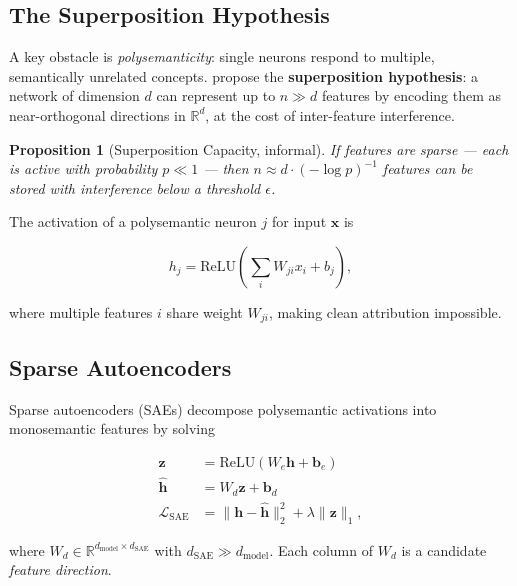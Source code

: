 \documentclass[10pt,twocolumn]{article}
\newtheorem{proposition}[theorem]{Proposition}
\begin{document}
\subsection{The Superposition Hypothesis}

A key obstacle is \emph{polysemanticity}: single neurons respond to
multiple, semantically unrelated concepts.  \citet{elhage2022superposition}
propose the \textbf{superposition hypothesis}: a network of dimension
$d$ can represent up to $n \gg d$ features by encoding them as
near-orthogonal directions in $\mathbb{R}^d$, at the cost of
inter-feature interference.

\begin{proposition}[Superposition Capacity, informal]
If features are sparse — each is active with probability $p \ll 1$ —
then $n \approx d \cdot (-\log p)^{-1}$ features can be stored with
interference below a threshold $\epsilon$.
\end{proposition}

The activation of a polysemantic neuron $j$ for input $\mathbf{x}$ is

\begin{equation}
  h_j = \text{ReLU}\!\left(\sum_{i} W_{ji} x_i + b_j\right),
  \label{eq:neuron}
\end{equation}

\noindent where multiple features $i$ share weight $W_{ji}$, making
clean attribution impossible.

\subsection{Sparse Autoencoders}

Sparse autoencoders (SAEs) \citep{bricken2023monosemanticity} decompose
polysemantic activations into monosemantic features by solving

\begin{align}
  \mathbf{z} &= \text{ReLU}(W_e \mathbf{h} + \mathbf{b}_e)
                \label{eq:sae_enc}\\
  \hat{\mathbf{h}} &= W_d \mathbf{z} + \mathbf{b}_d
                \label{eq:sae_dec}\\
  \mathcal{L}_{\text{SAE}} &= \|\mathbf{h} - \hat{\mathbf{h}}\|_2^2
                + \lambda \|\mathbf{z}\|_1,
                \label{eq:sae_loss}
\end{align}

\noindent where $W_d \in \mathbb{R}^{d_{\text{model}} \times d_{\text{SAE}}}$
with $d_{\text{SAE}} \gg d_{\text{model}}$.  Each column of $W_d$ is a
candidate \emph{feature direction}.
\end{document}
